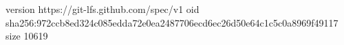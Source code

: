 version https://git-lfs.github.com/spec/v1
oid sha256:972ccb8ed324c085edda72e0ea2487706ecd6ec26d50e64c1c5c0a8969f49117
size 10619
